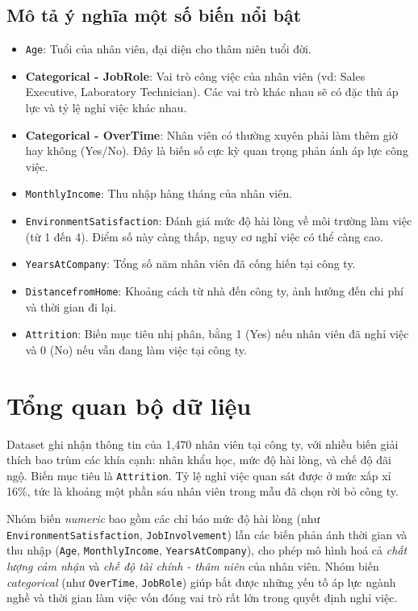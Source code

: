 \subsection*{Mô tả ý nghĩa một số biến nổi bật}
\begin{itemize}
  \item \texttt{Age}: Tuổi của nhân viên, đại diện cho thâm niên tuổi đời.
  \item \textbf{Categorical - JobRole}: Vai trò công việc của nhân viên (vd: Sales Executive, Laboratory Technician). Các vai trò khác nhau sẽ có đặc thù áp lực và tỷ lệ nghỉ việc khác nhau.
  \item \textbf{Categorical - OverTime}: Nhân viên có thường xuyên phải làm thêm giờ hay không (Yes/No). Đây là biến số cực kỳ quan trọng phản ánh áp lực công việc.
  \item \texttt{MonthlyIncome}: Thu nhập hàng tháng của nhân viên.
  \item \texttt{EnvironmentSatisfaction}: Đánh giá mức độ hài lòng về môi trường làm việc (từ 1 đến 4). Điểm số này càng thấp, nguy cơ nghỉ việc có thể càng cao.
  \item \texttt{YearsAtCompany}: Tổng số năm nhân viên đã cống hiến tại công ty.
  \item \texttt{DistancefromHome}: Khoảng cách từ nhà đến công ty, ảnh hưởng đến chi phí và thời gian đi lại.
  \item \texttt{Attrition}: Biến mục tiêu nhị phân, bằng 1 (Yes) nếu nhân viên đã nghỉ việc và 0 (No) nếu vẫn đang làm việc tại công ty.
\end{itemize}

\section{Tổng quan bộ dữ liệu}
Dataset ghi nhận thông tin của 1{,}470 nhân viên tại công ty, với nhiều biến giải thích bao trùm các khía cạnh: nhân khẩu học, mức độ hài lòng, và chế độ đãi ngộ. Biến mục tiêu là \texttt{Attrition}. Tỷ lệ nghỉ việc quan sát được ở mức xấp xỉ 16\%, tức là khoảng một phần sáu nhân viên trong mẫu đã chọn rời bỏ công ty. 

Nhóm biến \textit{numeric} bao gồm các chỉ báo mức độ hài lòng (như \texttt{EnvironmentSatisfaction}, \texttt{JobInvolvement}) lẫn các biến phản ánh thời gian và thu nhập (\texttt{Age}, \texttt{MonthlyIncome}, \texttt{YearsAtCompany}), cho phép mô hình hoá cả \textit{chất lượng cảm nhận} và \textit{chế độ tài chính - thâm niên} của nhân viên. Nhóm biến \textit{categorical} (như \texttt{OverTime}, \texttt{JobRole}) giúp bắt được những yếu tố áp lực ngành nghề và thời gian làm việc vốn đóng vai trò rất lớn trong quyết định nghỉ việc.

